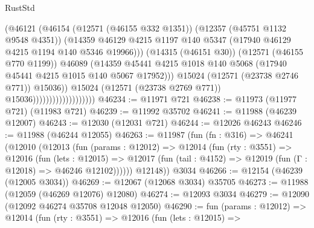 \begin{lexlean}{RustStd}
\begin{coremodule}
                                              (@46121
                                                (@46154
                                                  (@12571 (@46155 @332 @1351))
                                                  (@12357 (@45751 @1132 @9548 @4351))
                                                  (@14359
                                                    @46129
                                                    @4215
                                                    @1197
                                                    @140
                                                    @5347
                                                    (@17940 @46129 @4215 @1194 @140 @5346 @19966)))
                                                (@14315 (@46151 @30))
                                                (@12571 (@46155 @770 @1199))
                                                @46089
                                                (@14359
                                                  @45441
                                                  @4215
                                                  @1018
                                                  @140
                                                  @5068
                                                  (@17940 @45441 @4215 @1015 @140 @5067 @17952)))
                                              @15024
                                              (@12571 (@23738 @2746 @771))
                                              @15036))
                                          @15024
                                          (@12571 (@23738 @2769 @771))
                                          @15036)))))))))))))))))))
@46234 := @11971 @721
@46238 := @11973 (@11977 @721) (@11983 @721)
@46239 := @11992 @35702
@46241 := @11988 (@46239 @12007)
@46243 := @12030 (@12031 @721)
@46244 := @12026 @46243
@46246 := @11988 (@46244 @12055)
@46263 := @11987
    (fun (fn : @316) =>
    @46241
      (@12010
        (@12013
          (fun (params : @12012) =>
          @12014
            (fun (rty : @3551) =>
            @12016
              (fun (lets : @12015) =>
              @12017 (fun (tail : @4152) => @12019 (fun (Γ : @12018) => @46246 @12102))))))
        @12148))
    @3034
@46266 := @12154 (@46239 (@12005 @3034))
@46269 := @12067 (@12068 @3034) @35705
@46273 := @11988 (@12059 (@46269 @12076) @12080)
@46274 := @12093 @3034
@46279 := @12090 (@12092 @46274 @35708 @12048 @12050)
@46290 := fun (params : @12012) =>
  @12014
    (fun (rty : @3551) =>
    @12016
      (fun (lets : @12015) =>

\end{coremodule}
\end{lexlean}
